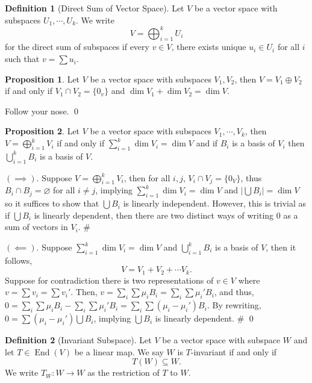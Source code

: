 \documentclass[
]{article}
\theoremstyle{definition}
\newtheorem{prop}{Proposition}[section]
\theoremstyle{definition}
\newtheorem{definition}{Definition}[section]
\begin{document}
\begin{definition}[Direct Sum of Vector Space]
  Let \(V\) be a vector space with subspaces \(U_1, \cdots, U_k\). We write 
  \[V = \bigoplus_{i = 1}^k U_i\]
  for the direct sum of subspaces if every \(v \in V\), there exists unique 
  \(u_i \in U_i\) for all \(i\) such that \(v = \sum u_i\).
\end{definition}

\begin{prop}
  Let \(V\) be a vector space with subspaces \(V_1, V_2\), then 
  \(V = V_1 \oplus V_2\) if and only if \(V_1 \cap V_2 = \{0_v\}\) and 
  \(\dim V_1 + \dim V_2 = \dim V\).
\end{prop}
\proof

Follow your nose. \qed

\begin{prop}
  Let \(V\) be a vector space with subspaces \(V_1, \cdots, V_k\), then 
  \(V = \bigoplus_{i = 1}^k V_i\) if and only if 
  \(\sum_{i = 1}^k \dim V_i = \dim V\) and if \(B_i\) is a basis of \(V_i\) then 
  \(\bigcup_{i = 1}^k B_i\) is a basis of \(V\).
\end{prop}
\proof

\((\implies)\). Suppose \(V = \bigoplus_{i = 1}^k V_i\), then for all
\(i, j\), \(V_i \cap V_j = \{0_V\}\), thus
\(B_i \cap B_j = \varnothing\) for all \(i \neq j\), implying
\(\sum_{i = 1}^k \dim V_i = \dim V\) and
\(\left| \bigcup B_i \right| = \dim V\) so it suffices to show that
\(\bigcup B_i\) is linearly independent. However, this is trivial as if
\(\bigcup B_i\) is linearly dependent, then there are two distinct ways
of writing 0 as a sum of vectors in \(V_i\). \#

\((\impliedby)\). Suppose \(\sum_{i = 1}^k \dim V_i = \dim V\) and
\(\bigcup_{i = 1}^k B_i\) is a basis of \(V\), then it follows,
\[V = V_1 + V_2 + \cdots V_k.\] Suppose for contradiction there is two
representations of \(v \in V\) where \(v = \sum v_i = \sum v_i'\). Then,
\(v = \sum_i \sum \mu_i B_i =  \sum_i \sum \mu_i' B_i\), and thus,
\(0 = \sum_i \sum \mu_i B_i -  \sum_i \sum \mu_i' B_i = \sum_i \sum (\mu_i - \mu_i') B_i\).
By rewriting, \(0 = \sum (\mu_i - \mu_i') \bigcup B_i\), implying
\(\bigcup B_i\) is linearly dependent. \# \qed

\begin{definition}[Invariant Subspace]
  Let \(V\) be a vector space with subspace \(W\) and let \(T \in \mathop{\mathrm{End}}(V)\) be 
  a linear map. We say \(W\) is \(T\)-invariant if and only if 
  \[T(W) \subseteq W.\]
  We write \(T_W : W \to W\) as the restriction of \(T\) to \(W\).
\end{definition}
\end{document}
